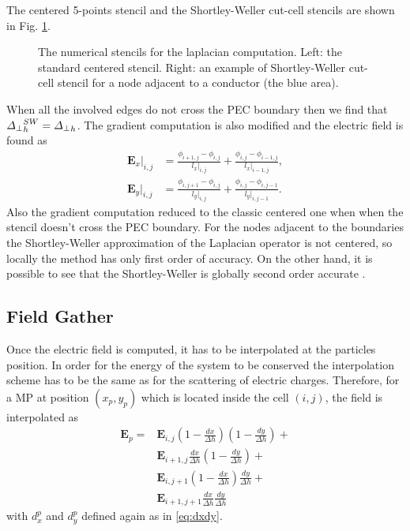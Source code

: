 The centered 5-points stencil and the Shortley-Weller cut-cell stencils are shown in Fig. \ref{fig:lapStencils}.
\begin{figure}
    \begin{subfigure}{0.45\linewidth}
        \centering
        
    \end{subfigure}
    \hfill
    \begin{subfigure}{0.45\linewidth}
        \centering
        
    \end{subfigure}
    \caption{The numerical stencils for the laplacian computation. Left: the standard centered stencil. Right: an example of Shortley-Weller cut-cell stencil for a node adjacent to a conductor (the blue area).}
    \label{fig:lapStencils}
\end{figure}
When all the involved edges do not cross the PEC boundary then we find that ${\Delta_{\perp}}_h^{SW} = {\Delta_{\perp}}_h$.
The gradient computation is also modified and the electric field is found as
\begin{align*}
    \mathbf{E}_x|_{i,j} &= \frac{\phi_{i+1,j} -  \phi_{i,j}}{l_x|_{i,j}} + \frac{\phi_{i,j} -  \phi_{i-1,j}}{l_x|_{i-1,j}},\\
    \mathbf{E}_y|_{i,j} &= \frac{\phi_{i,j+1} -  \phi_{i,j}}{l_y|_{i,j}} + \frac{\phi_{i,j} -  \phi_{i,j-1}}{l_y|_{i,j-1}}.
\end{align*}
Also the gradient computation reduced to the classic centered one when when the stencil doesn't cross the PEC boundary.
For the nodes adjacent to the boundaries the Shortley-Weller approximation of the Laplacian operator is not centered, so locally the method has only first order of accuracy. On the other hand, it is possible to see that the Shortley-Weller is globally second order accurate \cite{weynans:ShortleyWellerOrder}.

\subsection{Field Gather}
Once the electric field is computed, it has to be interpolated at the particles position. In order for the energy of the system to be conserved the interpolation scheme has to be the same as for the scattering of electric charges. Therefore, for a MP at position $(x_p, y_p)$ which is located inside the cell $(i, j)$, the field is interpolated as
\begin{align*}
    \mathbf{E}_p = &\mathbf{E}_{i,j}\left(1-\frac{dx}{\Delta h}\right)\left(1-\frac{dy}{\Delta h}\right) +\\ &\mathbf{E}_{i+1,j}\frac{dx}{\Delta h}\left(1-\frac{dy}{\Delta h}\right) +\\
    &\mathbf{E}_{i,j+1}\left(1-\frac{dx}{\Delta h}\right)\frac{dy}{\Delta h} +\\
    &\mathbf{E}_{i+1,j+1}\frac{dx}{\Delta h}\frac{dy}{\Delta h}
\end{align*}
with $d_x^p$ and $d_y^p$ defined again as in \ref{eq:dxdy}.

